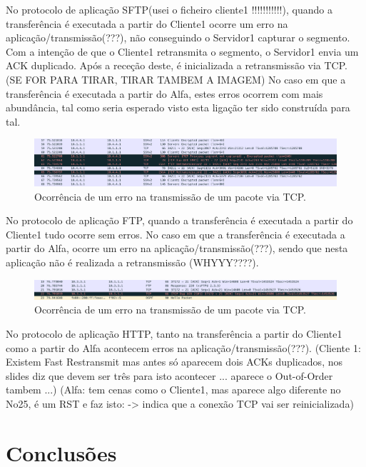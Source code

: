 \documentclass{llncs}
\begin{document}
No protocolo de aplicação SFTP(usei o ficheiro cliente1 !!!!!!!!!!!), quando a transferência é executada a partir do Cliente1 ocorre um erro na aplicação/transmissão(???), não conseguindo o Servidor1 capturar o segmento. Com a intenção de que o Cliente1 retransmita o segmento, o Servidor1 envia um ACK duplicado. Após a receção deste, é inicializada a retransmissão via TCP. (SE FOR PARA TIRAR, TIRAR TAMBEM A IMAGEM) No caso em que a transferência é executada a partir do Alfa, estes erros ocorrem com mais abundância, tal como seria esperado visto esta ligação ter sido construída para tal.

\begin{figure}[H]
\begin{center}
\includegraphics[scale=0.40]{4_sftp.png}
\end{center}
\caption{\label{fig:ssh}Ocorrência de um erro na transmissão de um pacote via TCP.}
\end{figure}

No protocolo de aplicação FTP, quando a transferência é executada a partir do Cliente1 tudo ocorre sem erros. No caso em que a transferência é executada a partir do Alfa, ocorre um erro na aplicação/transmissão(???), sendo que nesta aplicação não é realizada a retransmissão (WHYYY????).

\begin{figure}[H]
\begin{center}
\includegraphics[scale=0.40]{4_ftp.png}
\end{center}
\caption{\label{fig:ssh}Ocorrência de um erro na transmissão de um pacote via TCP.}
\end{figure}

No protocolo de aplicação HTTP, tanto na transferência a partir do Cliente1 como a partir do Alfa acontecem erros na aplicação/transmissão(???). (Cliente 1: Existem Fast Restransmit mas antes só aparecem dois ACKs duplicados, nos slides diz que devem ser três para isto acontecer ... aparece o Out-of-Order tambem ...) (Alfa: tem cenas como o Cliente1, mas aparece algo diferente no No25, é um RST e faz isto: -> indica que a conexão TCP vai ser reinicializada)



\section{Conclusões}
\end{document}

